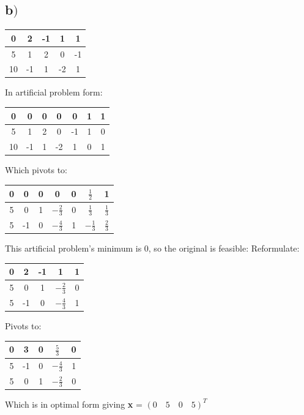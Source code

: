\documentclass[a4paper,12pt]{article}
\begin{document}
\subsection*{b\()\)}
\begin{center}
  \begin{tabular}{| c | c c c c |}
    \hline
    0 & 2 & -1 & 1 & 1 \\
    \hline
    5 & 1 & 2 & 0 & -1 \\
    10 & -1 & 1 & -2 & 1 \\
    \hline
  \end{tabular}
\end{center}
In artificial problem form:
\begin{center}
  \begin{tabular}{| c | c c c c c c |}
    \hline
    0 & 0 & 0 & 0 & 0 & 1 & 1 \\
    \hline
    5 & 1 & 2 & 0 & -1 & 1 & 0 \\
    10 & -1 & 1 & -2 & 1 & 0 & 1 \\
    \hline
  \end{tabular}
\end{center}
Which pivots to:
\begin{center}
  \begin{tabular}{| c | c c c c c c |}
    \hline
    0 & 0 & 0 & 0 & 0 & \(\frac{1}{2}\) & 1 \\
    \hline
    5 & 0 & 1 & \(-\frac{2}{3}\) & 0 & \(\frac{1}{3}\) & \(\frac{1}{3}\) \\
    5 & -1 & 0 & \(-\frac{4}{3}\) & 1 & \(-\frac{1}{3}\) & \(\frac{2}{3}\) \\
    \hline
  \end{tabular}
\end{center}
This artificial problem's minimum is 0, so the original is feasible: Reformulate:
\begin{center}
  \begin{tabular}{| c | c c c c |}
    \hline
    0 & 2 & -1 & 1 & 1 \\
    \hline
    5 & 0 & 1 & \(-\frac{2}{3}\) & 0 \\
    5 & -1 & 0 & \(-\frac{4}{3}\) & 1 \\
    \hline
  \end{tabular}
\end{center}
Pivots to:
\begin{center}
  \begin{tabular}{| c | c c c c |}
    \hline
    0 & 3 & 0 & \(\frac{5}{3}\) & 0 \\
    \hline
    5 & -1 & 0 & \(-\frac{4}{3}\) & 1 \\
    5 & 0 & 1 & \(-\frac{2}{3}\) & 0 \\
    \hline
  \end{tabular}
\end{center}
Which is in optimal form giving {\bf x} = \( (0 \quad 5 \quad 0 \quad  5)^T \)
\end{document}
